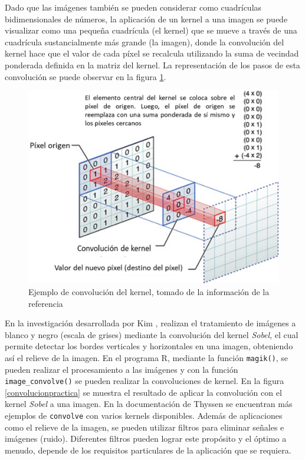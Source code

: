 \documentclass{article}
\begin{document}
Dado que las imágenes también se pueden considerar como cuadrículas bidimensionales de números, la aplicación de un kernel a una imagen se puede visualizar como una pequeña cuadrícula (el kernel) que se mueve a través de una cuadrícula sustancialmente más grande (la imagen), donde la convolución del kernel hace que el valor de cada píxel se recalcula utilizando la suma de vecindad ponderada definida en la matriz del kernel. La representación de los pasos de esta convolución se puede observar en la figura \ref{convolucion1}.  

\begin{figure}[h]
    \centering
    \includegraphics[scale=0.5]{Figures/Convolucion.png}
    \caption{Ejemplo de convolución del kernel, tomado de la información de la referencia \cite{developer}}
    \label{convolucion1}
\end{figure}

En la investigación desarrollada por Kim \cite{kim}, realizan el tratamiento de imágenes a blanco y negro (escala de grises) mediante la convolución del kernel \textit{Sobel}, el cual permite detectar los bordes verticales y horizontales en una imagen, obteniendo así el relieve de la imagen. En el programa R, mediante la función \texttt{magik()}, se pueden realizar el procesamiento a las imágenes y con la función \texttt{image\_convolve()} se pueden realizar la convoluciones de kernel. En la figura \ref{convolucionpractica} se muestra el resultado de aplicar la convolución con el kernel \textit{Sobel} a una imagen. En la documentación de Thyssen \cite{ImageMagick} se encuentran más ejemplos de \texttt{convolve} con varios kernels disponibles. Además de aplicaciones como el relieve de la imagen, se pueden utilizar filtros para eliminar señales e imágenes (ruido). Diferentes filtros pueden lograr este propósito y el óptimo a menudo, depende de los requisitos particulares de la aplicación que se requiera.
\end{document}
